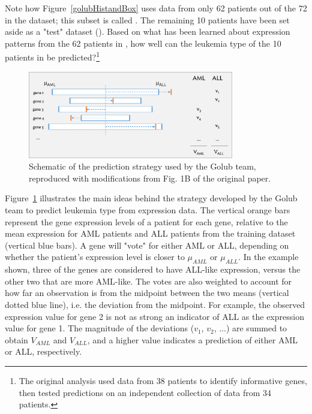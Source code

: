 
Note how Figure~\ref{golubHistandBox} uses data from only 62 patients out of the 72 in the  dataset; this subset is called . The remaining 10 patients have been set aside as a "test" dataset (). Based on what has been learned about expression patterns from the 62 patients in , how well can the leukemia type of the 10 patients in  be predicted?\footnote{The original analysis used data from 38 patients to identify informative genes, then tested predictions on an independent collection of data from 34 patients.}

\begin{figure}[h!]
	\centering
	{\includegraphics[width=0.80\textwidth]{ch_intro_to_data_oi_biostat/figures/golubPrediction/golubPrediction.png}
	\caption{Schematic of the prediction strategy used by the Golub team, reproduced with modifications from Fig. 1B of the original paper.
		\label{golubPrediction}}
	}
\end{figure}

Figure~\ref{golubPrediction} illustrates the main ideas behind the strategy developed by the Golub team to predict leukemia type from expression data. The vertical orange bars represent the gene expression levels of a patient for each gene, relative to the mean expression for AML patients and ALL patients from the training dataset (vertical blue bars). A gene will "vote" for either AML or ALL, depending on whether the patient's expression level is closer to $\mu_{AML}$ or $\mu_{ALL}$. In the example shown, three of the genes are considered to have ALL-like expression, versus the other two that are more AML-like. The votes are also weighted to account for how far an observation is from the midpoint between the two means (vertical dotted blue line), i.e. the deviation from the midpoint. For example, the observed expression value for gene 2 is not as strong an indicator of ALL as the expression value for gene 1. The magnitude of the deviations ($v_1$, $v_2$, ...) are summed to obtain $V_{AML}$ and $V_{ALL}$, and a higher value indicates a prediction of either AML or ALL, respectively.

